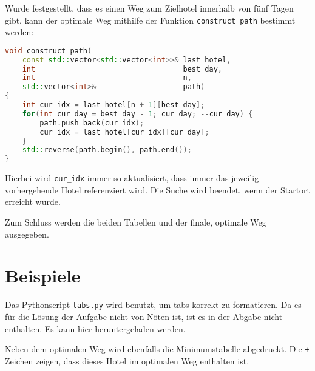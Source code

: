 \documentclass[a4paper,10pt,ngerman]{scrartcl}
\begin{document}
Wurde festgestellt, dass es einen Weg zum \glqq{}Zielhotel\grqq{} innerhalb von fünf Tagen gibt, kann der optimale Weg mithilfe der Funktion \lstinline{construct_path} bestimmt werden:
\begin{lstlisting}[language=C++]
void construct_path(
    const std::vector<std::vector<int>>& last_hotel,
    int                                  best_day,
    int                                  n,
    std::vector<int>&                    path)
{
    int cur_idx = last_hotel[n + 1][best_day];
    for(int cur_day = best_day - 1; cur_day; --cur_day) {
        path.push_back(cur_idx);
        cur_idx = last_hotel[cur_idx][cur_day];
    }
    std::reverse(path.begin(), path.end());
}
\end{lstlisting}
Hierbei wird \lstinline{cur_idx} immer so aktualisiert, dass immer das jeweilig vorhergehende Hotel referenziert wird.
Die Suche wird beendet, wenn der Startort erreicht wurde.

Zum Schluss werden die beiden Tabellen und der finale, optimale Weg ausgegeben.

\section{Beispiele}
Das Pythonscript \lstinline{tabs.py} wird benutzt, um tabs korrekt zu formatieren.
Da es für die Lösung der Aufgabe nicht von Nöten ist, ist es in der Abgabe nicht enthalten.
Es kann \href{https://gist.github.com/christopher-besch/d88a059a621e3e4a26983b3db576e48d}{hier} heruntergeladen werden.

Neben dem optimalen Weg wird ebenfalls die Minimumstabelle abgedruckt.
Die \lstinline{+} Zeichen zeigen, dass dieses Hotel im optimalen Weg enthalten ist.
\end{document}
